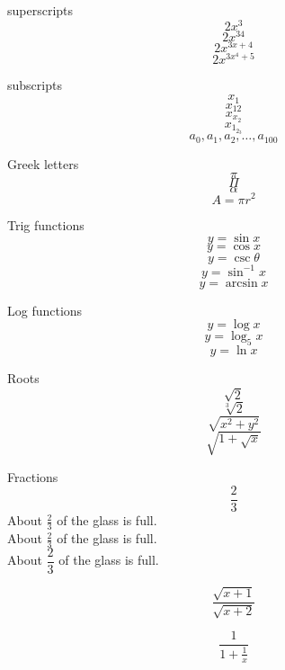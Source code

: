 \documentclass[11pt]{article}
\begin{document}
superscripts \[2x^3\]
\[2x^{34}\]
\[2x^{3x+4}\]
\[2x^{3x^4+5}\]

subscripts
\[x_1\]
\[x_{12}\]
\[x_{x_2}\]
\[x_{1_{2_3}}\]
\[a_0, a_1, a_2, \ldots, a_{100}\]

Greek letters
\[\pi\]
\[\Pi\]
\[\alpha\]
\[A=\pi r^2\]

Trig functions
\[y=\sin x\]
\[y=\cos x\]
\[y=\csc \theta\]
\[y=\sin^{-1} x\]
\[y=\arcsin x\]

Log functions
\[y=\log x\]
\[y=\log_5 x\]
\[y=\ln x\]

Roots
\[\sqrt{2}\]
\[\sqrt[3]{2}\]
\[\sqrt{x^2+y^2}\]
\[\sqrt{1+\sqrt{x}}\]

Fractions
\[\frac{2}{3}\]
About $\displaystyle \frac{2}{3}$ of the glass is full.\\[16pt]
About $\frac{2}{3}$ of the glass is full.\\[6pt]
About $\dfrac{2}{3}$ of the glass is full.

\[\frac{\sqrt{x+1}}{\sqrt{x+2}}\]

\[\frac{1}{1+\frac{1}{x}}\]
\end{document}
